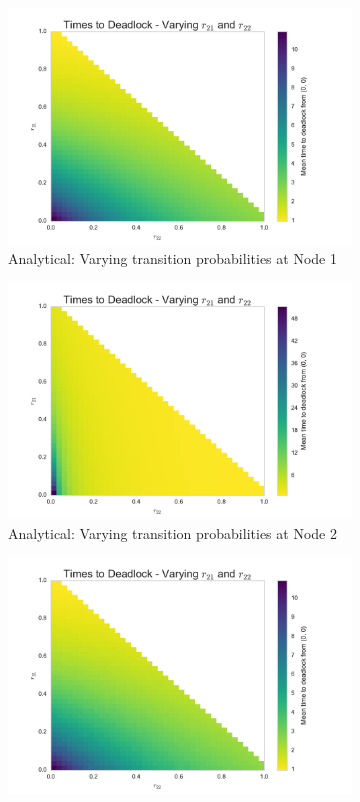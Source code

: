 \documentclass{article}
\begin{document}
\begin{figure}[H]
\begin{subfigure}[b]{0.5\textwidth}
  \includegraphics[width=\textwidth]{images/N1_heatmap}
  \caption{Analytical: Varying transition probabilities at Node 1}
  \label{fig:heatmap_anal_1}
\end{subfigure}
\begin{subfigure}[b]{0.5\textwidth}
  \includegraphics[width=\textwidth]{images/N2_heatmap}
  \caption{Analytical: Varying transition probabilities at Node 2}
  \label{fig:heatmap_anal_2}
\end{subfigure}
\begin{subfigure}[b]{0.5\textwidth}
  \includegraphics[width=\textwidth]{images/N1_heatmap_sim}

\end{subfigure}
\end{figure}
\end{document}
